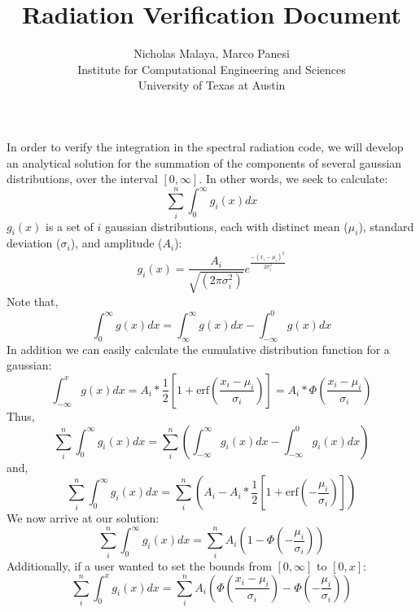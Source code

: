 \documentclass{article}
\title{\bf{Radiation Verification Document}}
\author{Nicholas Malaya, Marco Panesi \\ Institute for Computational Engineering and Sciences \\ University of Texas at Austin} \date{}
\begin{document}
\maketitle

In order to verify the integration in the spectral radiation code, we will develop an analytical solution for 
the summation of the components of several gaussian distributions, over the interval $[0,\infty]$. 
\newline
\newline
In other words, we seek to calculate:
\begin{equation}
  \sum_i^n \int^\infty_0 g_i(x) dx
\end{equation}
\newline
\newline
$g_i(x)$ is a set of $i$ gaussian distributions, each with distinct mean ($\mu_i$), standard deviation ($\sigma_i$), and amplitude ($A_i$):
\begin{equation}
  g_i(x) = \frac{A_i}{\sqrt{(2 \pi \sigma_i^2)}}e^{\frac{-(x_i-\mu_i)^2}{2 \sigma_i^2}}
\end{equation}
\newline
\newline
Note that,
\begin{equation}
  \int^\infty_0 g(x) dx = \int^\infty_\infty g(x) dx  -  \int^0_{-\infty} g(x)dx
\end{equation}
In addition we can easily calculate the cumulative distribution function for a gaussian:
\begin{equation}
  \int^x_{-\infty} g(x) dx = A_i * \frac12 [1+\textrm{erf}(\frac{x_i-\mu_i}{\sigma_i})] = A_i * \Phi(\frac{x_i-\mu_i}{\sigma_i})
\end{equation}
Thus, 
\begin{equation}
  \sum_i^n \int^\infty_0 g_i(x) dx = \sum_i^n ( \int^\infty_{-\infty} g_i(x) dx  -  \int^0_{-\infty} g_i(x)dx)
\end{equation}
and,
\begin{equation}
  \sum_i^n \int^\infty_0 g_i(x) dx = \sum_i^n ( A_i  - A_i * \frac12 [1+\textrm{erf}(-\frac{\mu_i}{\sigma_i})])
\end{equation}
We now arrive at our solution:
\begin{equation}
  \sum_i^n \int^\infty_0 g_i(x) dx = \sum_i^n A_i ( 1  -  \Phi(-\frac{\mu_i}{\sigma_i}))
\end{equation}
\newline
\newline
Additionally, if a user wanted to set the bounds from $[0,\infty]$ to $[0,x]$:
\begin{equation}
  \sum_i^n \int^x_0 g_i(x) dx = \sum_i^n A_i ( \Phi(\frac{x_i-\mu_i}{\sigma_i}) - \Phi(-\frac{\mu_i}{\sigma_i}))
\end{equation}
\end{document}
